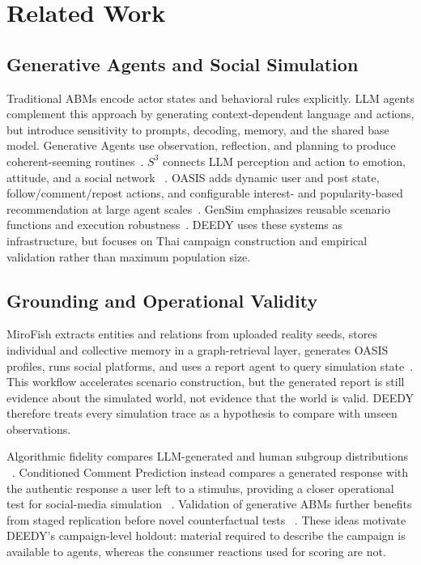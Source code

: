 \documentclass[conference]{IEEEtran}
\begin{document}
\section{Related Work}

\subsection{Generative Agents and Social Simulation}

Traditional ABMs encode actor states and behavioral rules explicitly. LLM
agents complement this approach by generating context-dependent language and
actions, but introduce sensitivity to prompts, decoding, memory, and the shared
base model. Generative Agents use observation, reflection, and planning to
produce coherent-seeming routines~\cite{park2023generative}. $S^3$ connects LLM
perception and action to emotion, attitude, and a social network
~\cite{gao2023s3}. OASIS adds dynamic user and post state, follow/comment/repost
actions, and configurable interest- and popularity-based recommendation at
large agent scales~\cite{yang2024oasis}. GenSim emphasizes reusable scenario
functions and execution robustness~\cite{tang2025gensim}. DEEDY uses these
systems as infrastructure, but focuses on Thai campaign construction and
empirical validation rather than maximum population size.

\subsection{Grounding and Operational Validity}

MiroFish extracts entities and relations from uploaded reality seeds, stores
individual and collective memory in a graph-retrieval layer, generates OASIS
profiles, runs social platforms, and uses a report agent to query simulation
state~\cite{mirofish2026}. This workflow accelerates scenario construction, but
the generated report is still evidence about the simulated world, not evidence
that the world is valid. DEEDY therefore treats every simulation trace as a
hypothesis to compare with unseen observations.

Algorithmic fidelity compares LLM-generated and human subgroup distributions
~\cite{argyle2023out}. Conditioned Comment Prediction instead compares a
generated response with the authentic response a user left to a stimulus,
providing a closer operational test for social-media simulation
~\cite{schwager2026conditioned}. Validation of generative ABMs further benefits
from staged replication before novel counterfactual tests
~\cite{cross2025validating}. These ideas motivate DEEDY's campaign-level
holdout: material required to describe the campaign is available to agents,
whereas the consumer reactions used for scoring are not.
\end{document}
